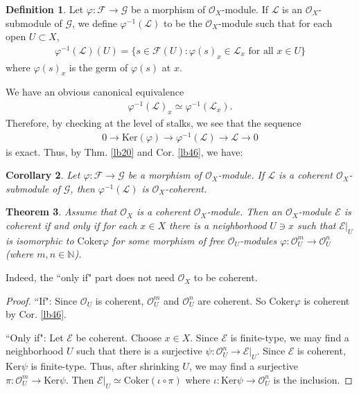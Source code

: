 \documentclass[12pt,b5paper,notitlepage]{report}
\theoremstyle{definition}
\newtheorem{df}{Definition}[section]
\theoremstyle{plain}
\newtheorem{thm}[df]{Theorem}
\newtheorem{co}[df]{Corollary}
\newcommand{\scr}{\mathscr}
\newcommand{\Nbb}{\mathbb N}
\newcommand{\Ker}{\mathrm{Ker}}
\newcommand{\Cok}{\mathrm{Coker}}
\numberwithin{equation}{section}
\begin{document}
\begin{df}\label{lb171}
Let $\varphi:\scr F\rightarrow\scr G$ be a morphism of $\scr O_X$-module. If $\scr L$ is an $\scr O_X$-submodule of $\scr G$, we define $\varphi^{-1}(\scr L)$ \index{zz@$\varphi^{-1}(\scr L)$} to be the $\scr O_X$-module such that for each open $U\subset X$,
\begin{align}
\varphi^{-1}(\scr L)(U)=\{s\in\scr F(U):\varphi(s)_x\in\scr L_x\text{ for all } x\in U\}
\end{align}
where $\varphi(s)_x$ is the germ of $\varphi(s)$ at $x$. 
\end{df}

We have an obvious canonical equivalence
\begin{align}
\varphi^{-1}(\scr L)_x\simeq \varphi^{-1}(\scr L_x).
\end{align}
Therefore, by checking at the level of stalks, we see that the sequence
\begin{align}
0\rightarrow\Ker(\varphi)\rightarrow\varphi^{-1}(\scr L)\rightarrow\scr L\rightarrow0
\end{align}
is exact. Thus, by Thm. \ref{lb20} and Cor. \ref{lb46}, we have:

\begin{co}\label{lb172}
Let $\varphi:\scr F\rightarrow\scr G$ be a morphism of $\scr O_X$-module. If $\scr L$ is a coherent $\scr O_X$-submodule of $\scr G$, then $\varphi^{-1}(\scr L)$ is $\scr O_X$-coherent.
\end{co}





\begin{thm}\label{lb48}
Assume that $\scr O_X$ is a coherent $\scr O_X$-module. Then an $\scr O_X$-module $\scr E$ is coherent if and only if for each $x\in X$ there is a neighborhood $U\ni x$ such that $\scr E|_U$ is isomorphic to $\Cok\varphi$ for some morphism of free $\scr O_U$-modules $\varphi:\scr O_U^m\rightarrow\scr O_U^n$ (where $m,n\in\Nbb$).
\end{thm}
Indeed, the ``only if" part does not need $\scr O_X$ to be coherent.

\begin{proof}
``If": Since $\scr O_U$ is coherent, $\scr O_U^m$ and $\scr O_U^n$ are coherent. So $\Cok\varphi$ is coherent by Cor. \ref{lb46}.

``Only if": Let $\scr E$ be coherent. Choose $x\in X$. Since $\scr E$ is finite-type, we may find a neighborhood $U$ such that there is a surjective $\psi:\scr O_U^n\rightarrow\scr E|_U$. Since $\scr E$ is coherent, $\Ker\psi$ is finite-type. Thus, after shrinking $U$, we may find a surjective $\pi:\scr O_U^m\rightarrow\Ker\psi$. Then $\scr E|_U\simeq\Cok(\iota\circ\pi)$ where $\iota:\Ker\psi\rightarrow\scr O_U^n$ is the inclusion. 
\end{proof}
\end{document}
